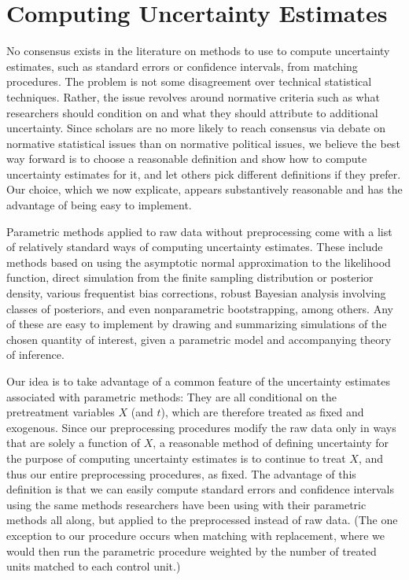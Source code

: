 \documentclass[11pt,titlepage]{article}
\begin{document}
\section{Computing Uncertainty Estimates}

No consensus exists in the literature on methods to use to compute
uncertainty estimates, such as standard errors or confidence
intervals, from matching procedures.  The problem is not some
disagreement over technical statistical techniques.  Rather, the issue
revolves around normative criteria such as what researchers should
condition on and what they should attribute to additional uncertainty.
Since scholars are no more likely to reach consensus via debate on
normative statistical issues than on normative political issues, we
believe the best way forward is to choose a reasonable definition and
show how to compute uncertainty estimates for it, and let others pick
different definitions if they prefer.  Our choice, which we now
explicate, appears substantively reasonable and has the advantage of
being easy to implement.

Parametric methods applied to raw data without preprocessing come with
a list of relatively standard ways of computing uncertainty estimates.
These include methods based on using the asymptotic normal
approximation to the likelihood function, direct simulation from the
finite sampling distribution or posterior density, various frequentist
bias corrections, robust Bayesian analysis involving classes of
posteriors, and even nonparametric bootstrapping, among others.  Any
of these are easy to implement by drawing and summarizing simulations
of the chosen quantity of interest, given a parametric model and
accompanying theory of inference.

Our idea is to take advantage of a common feature of the uncertainty
estimates associated with parametric methods: They are all conditional
on the pretreatment variables $X$ (and $t$), which are therefore
treated as fixed and exogenous.  Since our preprocessing procedures
modify the raw data only in ways that are solely a function of $X$, a
reasonable method of defining uncertainty for the purpose of computing
uncertainty estimates is to continue to treat $X$, and thus our entire
preprocessing procedures, as fixed.  The advantage of this definition
is that we can easily compute standard errors and confidence intervals
using the same methods researchers have been using with their
parametric methods all along, but applied to the preprocessed instead
of raw data.  (The one exception to our procedure occurs when matching
with replacement, where we would then run the parametric procedure
weighted by the number of treated units matched to each control unit.)
\end{document}
